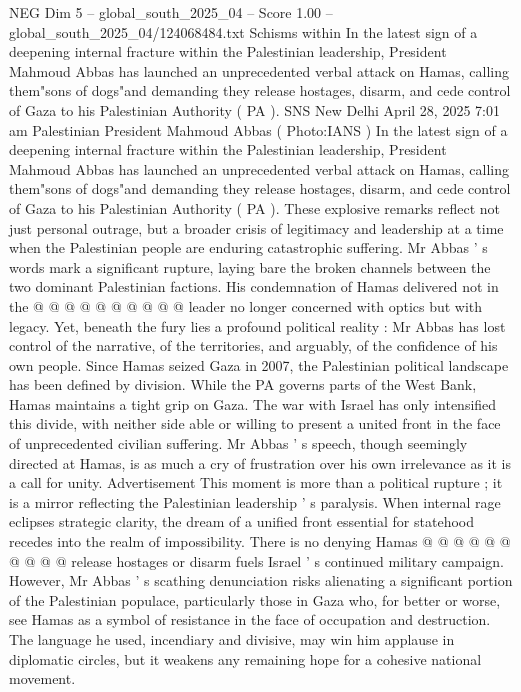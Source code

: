 \begin{textsample}{NEG Dim 5 – global\_south\_2025\_04 – Score 1.00 – global\_south\_2025\_04/124068484.txt}  \label{ex:f5_neg_395}
Schisms within In the latest sign of a deepening internal fracture within the Palestinian leadership, President Mahmoud Abbas has launched an unprecedented verbal attack on Hamas, calling them"sons of dogs"and demanding they release hostages, disarm, and cede control of Gaza to his Palestinian Authority ( PA ).
SNS New Delhi April 28, 2025 7:01 am Palestinian President Mahmoud Abbas ( Photo:IANS ) In the latest sign of a deepening internal fracture within the Palestinian leadership, President Mahmoud Abbas has launched an unprecedented verbal attack on Hamas, calling them"sons of dogs"and demanding they release hostages, disarm, and cede control of Gaza to his Palestinian Authority ( PA ).
These explosive remarks reflect not just personal outrage, but a broader crisis of legitimacy and leadership at a time when the Palestinian people are enduring catastrophic suffering.
Mr Abbas ' s words mark a significant rupture, laying bare the broken channels between the two dominant Palestinian factions.
His condemnation of Hamas delivered not in the @ @ @ @ @ @ @ @ @ @ leader no longer concerned with optics but with legacy.
Yet, beneath the fury lies a profound political reality : Mr Abbas has lost control of the narrative, of the territories, and arguably, of the confidence of his own people.
Since Hamas seized Gaza in 2007, the Palestinian political landscape has been defined by division.
While the PA governs parts of the West Bank, Hamas maintains a tight grip on Gaza.
The war with Israel has only intensified this divide, with neither side able or willing to present a united front in the face of unprecedented civilian suffering.
Mr Abbas ' s speech, though seemingly directed at Hamas, is as much a cry of frustration over his own irrelevance as it is a call for unity.
Advertisement This moment is more than a political rupture ; it is a mirror reflecting the Palestinian leadership ' s paralysis.
When internal rage eclipses strategic clarity, the dream of a unified front essential for statehood recedes into the realm of impossibility.
There is no denying Hamas @ @ @ @ @ @ @ @ @ @ release hostages or disarm fuels Israel ' s continued military campaign.
However, Mr Abbas ' s scathing denunciation risks alienating a significant portion of the Palestinian populace, particularly those in Gaza who, for better or worse, see Hamas as a symbol of resistance in the face of occupation and destruction.
The language he used, incendiary and divisive, may win him applause in diplomatic circles, but it weakens any remaining hope for a cohesive national movement.

\end{textsample}
